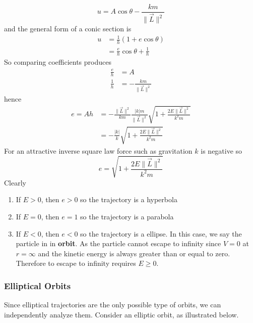\begin{equation}
    u = A \cos \theta - \frac{km}{\| \vec{L} \|^2}
\end{equation}
and the general form of a conic section is
\begin{align*}
    u &= \frac{1}{h} (1 + e\cos \theta) \\
    &= \frac{e}{h} \cos \theta + \frac{1}{h}
\end{align*}
So comparing coefficients produces
\begin{align}
    \frac{e}{h} &= A \\
    \frac{1}{h} &= - \frac{km}{\| \vec{L} \|^2}
    \label{eq:conic-h}
\end{align}
hence
\begin{align}
    e = Ah &= - \frac{\| \vec{L} \|^2}{km} \frac{\left|k\right|m}{\| \vec{L} \|^2} \sqrt{1 + \frac{2 E \| \vec{L} \|^2}{k^2m}} \\
    &= - \frac{|k|}{k} \sqrt{1 + \frac{2 E \| \vec{L} \|^2}{k^2m}}
\end{align}
For an attractive inverse square law force such as gravitation $k$ is negative so
\begin{equation}
    \label{eq:conic-e}
    e = \sqrt{1 + \frac{2 E \| \vec{L} \|^2}{k^2m}}
\end{equation}
Clearly
\begin{enumerate}
    \item If $E > 0$, then $e > 0$ so the trajectory is a hyperbola
    \item If $E = 0$, then $e = 1$ so the trajectory is a parabola
    \item If $E < 0$, then $e < 0$ so the trajectory is a ellipse. In this case, we say the particle in in \textbf{orbit}. As the particle cannot escape to infinity since $V = 0$ at $r = \infty$ and the kinetic energy is always greater than or equal to zero. Therefore to escape to infinity requires $E \geq 0$.
\end{enumerate}

\subsubsection{Elliptical Orbits}

Since elliptical trajectories are the only possible type of orbits, we can independently analyze them. Consider an elliptic orbit, as illustrated below.

